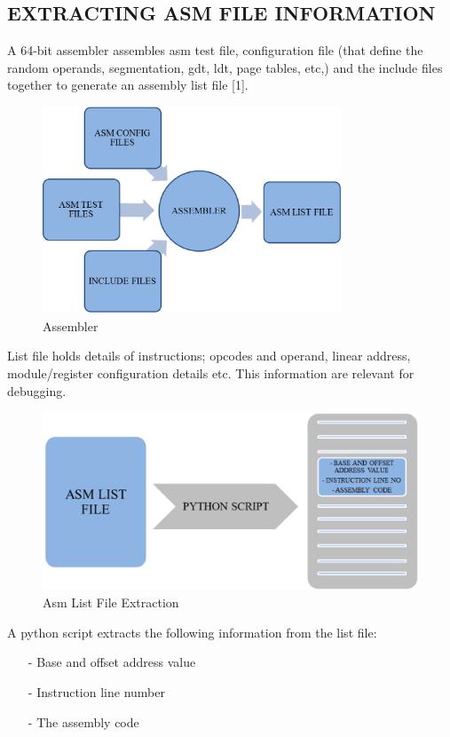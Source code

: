 \subsection {EXTRACTING ASM FILE INFORMATION}
A 64-bit assembler assembles asm test file, configuration file (that define the random operands, segmentation, gdt, ldt, page tables, etc,) and the include files together to generate an assembly list file [1].
\begin{figure}[H]
\centering
\includegraphics[width=3.5in]{./figures/asm.eps}
\caption{Assembler}
\end{figure}

List file holds details of instructions; opcodes and operand, linear address, module/register configuration details etc. This information are relevant for debugging.
\begin{figure}[H]
\centering
\includegraphics[width=4.5in]{./figures/list.eps}
\caption{Asm List File Extraction}
\end{figure}
A python script extracts the following information from the list file:

\begin{itemize}
	\item[-] Base and offset address value
	\item[-] Instruction line number
	\item[-] The assembly code
\end{itemize}


